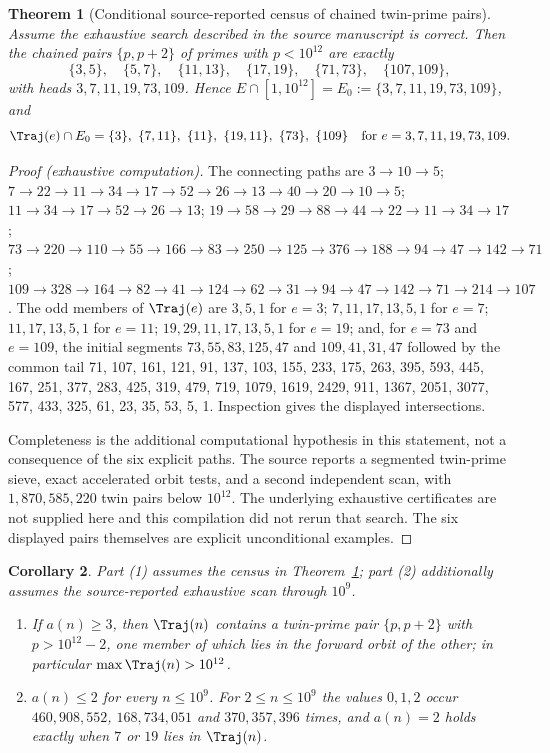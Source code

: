 \documentclass[11pt,a4paper]{article}
\newtheorem{theorem}{Theorem}[section]
\newtheorem{corollary}[theorem]{Corollary}
\theoremstyle{definition}
\theoremstyle{remark}
\numberwithin{equation}{section}
\begin{document}
\begin{theorem}[Conditional source-reported census of chained twin-prime pairs]\label{B:P:thm:census}
Assume the exhaustive search described in the source manuscript is correct.
Then the chained pairs $\{p,p+2\}$ of primes with $p<10^{12}$ are exactly
\[
\{3,5\},\quad \{5,7\},\quad \{11,13\},\quad \{17,19\},\quad \{71,73\},\quad \{107,109\},
\]
with heads $3,7,11,19,73,109$. Hence
$E\cap[1,10^{12}]=E_0:=\{3,7,11,19,73,109\}$, and
\[
\Traj(e)\cap E_0=\{3\},\ \{7,11\},\ \{11\},\ \{19,11\},\ \{73\},\ \{109\}
\quad\text{for } e=3,7,11,19,73,109 .
\]
\end{theorem}

\begin{proof}[Proof (exhaustive computation)]
The connecting paths are
$3\to10\to5$;
$7\to22\to11\to34\to17\to52\to26\to13\to40\to20\to10\to5$;
$11\to34\to17\to52\to26\to13$;
$19\to58\to29\to88\to44\to22\to11\to34\to17$;
$73\to220\to110\to55\to166\to83\to250\to125\to376\to188\to94\to47\to142\to71$;
$109\to328\to164\to82\to41\to124\to62\to31\to94\to47\to142\to71\to214\to107$.
The odd members of $\Traj(e)$ are $3,5,1$ for $e=3$; $7,11,17,13,5,1$ for $e=7$;
$11,17,13,5,1$ for $e=11$; $19,29,11,17,13,5,1$ for $e=19$; and, for $e=73$ and
$e=109$, the initial segments $73,55,83,125,47$ and $109,41,31,47$ followed by
the common tail
71, 107, 161, 121, 91, 137, 103, 155, 233, 175, 263, 395, 593, 445, 167, 251, 377,
283, 425, 319, 479, 719, 1079, 1619, 2429, 911, 1367, 2051, 3077, 577, 433, 325,
61, 23, 35, 53, 5, 1.
Inspection gives the displayed intersections.

Completeness is the additional computational hypothesis in this
statement, not a consequence of the six explicit paths. The source reports
a segmented twin-prime sieve, exact accelerated orbit tests, and a second
independent scan, with $1{,}870{,}585{,}220$ twin pairs below $10^{12}$.
The underlying exhaustive certificates are not supplied here and this
compilation did not rerun that search. The six displayed pairs themselves
are explicit unconditional examples.

\end{proof}

\begin{corollary}\label{B:P:cor:twin}
Part (1) assumes the census in Theorem~\ref{B:P:thm:census}; part (2) additionally
assumes the source-reported exhaustive scan through $10^9$.
\begin{enumerate}
\item If $a(n)\ge3$, then $\Traj(n)$ contains a twin-prime pair $\{p,p+2\}$ with
$p>10^{12}-2$, one member of which lies in the forward orbit of the other; in
particular $\max\Traj(n)>10^{12}$.
\item $a(n)\le2$ for every $n\le10^9$. For $2\le n\le10^9$ the values $0,1,2$
occur $460{,}908{,}552$, $168{,}734{,}051$ and $370{,}357{,}396$ times, and
$a(n)=2$ holds exactly when $7$ or $19$ lies in $\Traj(n)$.
\end{enumerate}
\end{corollary}
\end{document}
